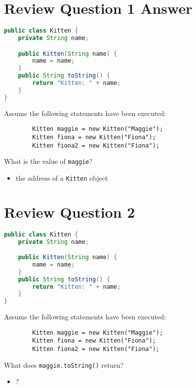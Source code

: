 \documentclass{article}
\begin{document}
\section{Review Question 1 Answer}

\begin{lstlisting}[language=Java]
public class Kitten {
    private String name;

    public Kitten(String name) {
        name = name;
    }
    public String toString() {
        return "Kitten: " + name;
    }
}
\end{lstlisting}

Assume the following statements have been executed:

\begin{lstlisting}
        Kitten maggie = new Kitten("Maggie");
        Kitten fiona = new Kitten("Fiona");
        Kitten fiona2 = new Kitten("Fiona");
\end{lstlisting}

What is the value of {\tt maggie}?
\begin{itemize}
\itemsep0em
\item the address of a {\tt Kitten} object
\end{itemize}




\section{Review Question 2}

\begin{lstlisting}[language=Java]
public class Kitten {
    private String name;

    public Kitten(String name) {
        name = name;
    }
    public String toString() {
        return "Kitten: " + name;
    }
}
\end{lstlisting}

Assume the following statements have been executed:

\begin{lstlisting}
        Kitten maggie = new Kitten("Maggie");
        Kitten fiona = new Kitten("Fiona");
        Kitten fiona2 = new Kitten("Fiona");
\end{lstlisting}

What does {\tt maggie.toString()} return?
\begin{itemize}
\itemsep0em
\item ?
\end{itemize}
\end{document}
